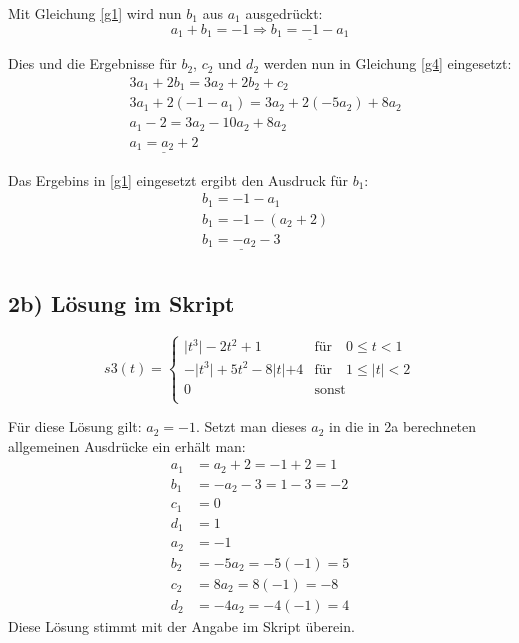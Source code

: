 \documentclass[a4paper,11pt,oneside]{scrartcl}
\begin{document}
Mit Gleichung \eqref{g1} wird nun $b_1$ aus $a_1$ ausgedrückt:
\begin{equation*}a_1 + b_1 = -1 \Rightarrow \underline{b_1 = -1 -a_1}\end{equation*}

Dies und die Ergebnisse für $b_2$, $c_2$ und $d_2$ werden nun in Gleichung \eqref{g4} eingesetzt:
\begin{align*}
&3a_1 + 2b_1 = 3a_2 + 2b_2 + c_2\\
&3a_1 + 2(-1 -a_1) = 3a_2 + 2(-5a_2) + 8a_2\\
&a_1 -2 = 3a_2 - 10a_2 + 8a_2\\
&\underline{a_1 = a_2 + 2}
\end{align*}

Das Ergebins in \eqref{g1} eingesetzt ergibt den Ausdruck für $b_1$:
\begin{align*}
&b_1 = -1 - a_1\\
&b_1 = -1 - (a_2 + 2)\\
&\underline{b_1 = -a_2 - 3}\\
\end{align*}

\subsection*{2b) Lösung im Skript}
\begin{equation*}
s3(t) = 
 \left\{ 
  \begin{array}{ll}
   \lvert t^3\rvert - 2t^2 + 1 & \text{für} \quad 0 \leq t < 1\\
   - \lvert t^3\rvert + 5t^2 -8\rvert t \lvert +4 & \text{für} \quad 1 \leq \rvert t \lvert < 2\\
   0 & \text{sonst}\\
  \end{array} 
 \right.
\end{equation*}

Für diese Lösung gilt: $a_2 = -1$. Setzt man dieses $a_2$ in die in 2a berechneten allgemeinen Ausdrücke ein erhält man:
\begin{align*}
a_1 &= a_2 + 2 = -1 + 2 = 1\\
b_1 &= -a_2 - 3 = 1 - 3 = -2\\
c_1 &= 0\\
d_1 &= 1\\
a_2 &= -1\\
b_2 &= -5a_2 = -5(-1) = 5\\
c_2 &= 8a_2 = 8(-1) = -8\\
d_2 &= -4a_2 = -4(-1) = 4
\end{align*}
Diese Lösung stimmt mit der Angabe im Skript überein.
\end{document}
